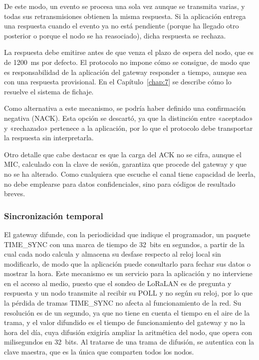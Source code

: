 De este modo, un evento se procesa una sola vez aunque se transmita varias, y todas sus retransmisiones obtienen la misma respuesta. Si la aplicación entrega una respuesta cuando el evento ya no está pendiente (porque ha llegado otro posterior o porque el nodo se ha reasociado), dicha respuesta se rechaza.


La respuesta debe emitirse antes de que venza el plazo de espera del nodo, que es de 1200~ms por defecto. El protocolo no impone cómo se consigue, de modo que es responsabilidad de la aplicación del gateway responder a tiempo, aunque sea con una respuesta provisional. En el Capítulo~\ref{chap:7} se describe cómo lo resuelve el sistema de fichaje.

Como alternativa a este mecanismo, se podría haber definido una confirmación negativa (NACK). Esta opción se descartó, ya que la distinción entre «aceptado» y «rechazado» pertenece a la aplicación, por lo que el protocolo debe transportar la respuesta sin interpretarla.

Otro detalle que cabe destacar es que la carga del ACK no se cifra, aunque el MIC, calculado con la clave de sesión, garantiza que procede del gateway y que no se ha alterado. Como cualquiera que escuche el canal tiene capacidad de leerla, no debe emplearse para datos confidenciales, sino para códigos de resultado breves.



\subsubsection{Sincronización temporal}

El gateway difunde, con la periodicidad que indique el programador, un paquete TIME\_SYNC con una marca de tiempo de 32~bits en segundos, a partir de la cual cada nodo calcula y almacena su desfase respecto al reloj local sin modificarlo, de modo que la aplicación puede consultarlo para fechar sus datos o mostrar la hora. Este mecanismo es un servicio para la aplicación y no interviene en el acceso al medio, puesto que el sondeo de LoRaLAN es de pregunta y respuesta y un nodo transmite al recibir su POLL y no según su reloj, por lo que la pérdida de tramas TIME\_SYNC no afecta al funcionamiento de la red. Su resolución es de un segundo, ya que no tiene en cuenta el tiempo en el aire de la trama, y el valor difundido es el tiempo de funcionamiento del gateway y no la hora del día, cuya difusión exigiría ampliar la aritmética del nodo, que opera con milisegundos en 32~bits. Al tratarse de una trama de difusión, se autentica con la clave maestra, que es la única que comparten todos los nodos.

